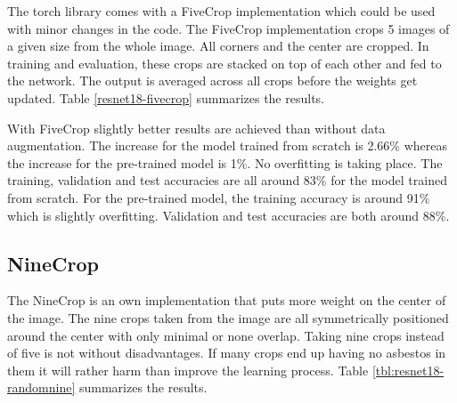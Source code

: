 The torch library comes with a FiveCrop implementation which could be used with minor changes in the code. The FiveCrop implementation crops 5 images of a given size from the whole image. All corners and the center are cropped. In training and evaluation, these crops are stacked on top of each other and fed to the network. The output is averaged across all crops before the weights get updated. Table \ref{resnet18-fivecrop} summarizes the results.\\


\begin{table}[!h] \centering
{}
\caption{Resnet18 FiveCrop Implementation with and without pre-training. FINAL (regular) means ResNet18 with the resizing of the image instead of cropping and averaging}
\label{tbl:resnet18-fivecrop}
\end{table}

With FiveCrop slightly better results are achieved than without data augmentation. The increase for the model trained from scratch is 2.66\% whereas the increase for the pre-trained model is 1\%. No overfitting is taking place. The training, validation and test accuracies are all around 83\% for the model trained from scratch. For the pre-trained model, the training accuracy is around 91\% which is slightly overfitting. Validation and test accuracies are both around 88\%.

\subsection{NineCrop}

The NineCrop is an own implementation that puts more weight on the center of the image. The nine crops taken from the image are all symmetrically positioned around the center with only minimal or none overlap. Taking nine crops instead of five is not without disadvantages. If many crops end up having no asbestos in them it will rather harm than improve the learning process. Table \ref{tbl:resnet18-randomnine} summarizes the results.

